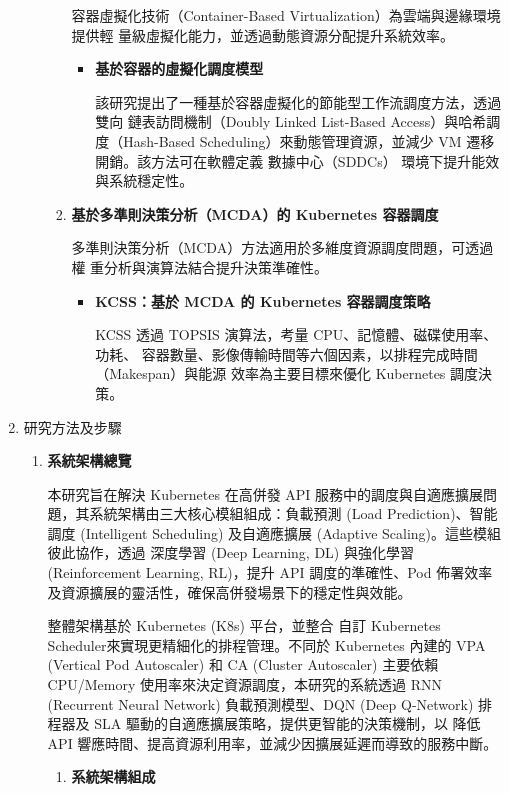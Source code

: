 \documentclass[12pt,a4paper]{article}
\begin{document}
\begin{enumerate}[label={(\zhdig*)}, leftmargin=2\parindent, listparindent=\parindent]
\begin{enumerate}[label={(\arabic*)}, leftmargin=\parindent, listparindent=\parindent]
\begin{enumerate}[label={(\arabic*)}, leftmargin=\parindent, listparindent=\parindent]
容器虛擬化技術（Container-Based Virtualization）為雲端與邊緣環境提供輕
量級虛擬化能力，並透過動態資源分配提升系統效率。
\begin{itemize}[leftmargin=\parindent, listparindent=\parindent]
    \item \textbf{
\cite{15} 基於容器的虛擬化調度模型
    }

該研究提出了一種基於容器虛擬化的節能型工作流調度方法，透過雙向
鏈表訪問機制（Doubly Linked List-Based Access）與哈希調度（Hash-Based
Scheduling）來動態管理資源，並減少 VM 遷移開銷。該方法可在軟體定義
數據中心（SDDCs） 環境下提升能效與系統穩定性。

    \end{itemize}
    \item \textbf{
基於多準則決策分析（MCDA）的 Kubernetes 容器調度
}

多準則決策分析（MCDA）方法適用於多維度資源調度問題，可透過權
重分析與演算法結合提升決策準確性。
\begin{itemize}[leftmargin=\parindent, listparindent=\parindent]
    \item \textbf{
\cite{16} KCSS：基於 MCDA 的 Kubernetes 容器調度策略
    }

KCSS 透過 TOPSIS 演算法，考量 CPU、記憶體、磁碟使用率、功耗、
容器數量、影像傳輸時間等六個因素，以排程完成時間（Makespan）與能源
效率為主要目標來優化 Kubernetes 調度決策。

    \end{itemize}

\end{enumerate}
\end{enumerate}
\item 研究方法及步驟
\begin{enumerate}[label={(\arabic*)}, leftmargin=\parindent, listparindent=\parindent]

\item \textbf{
系統架構總覽
}

本研究旨在解決 Kubernetes 在高併發 API 服務中的調度與自適應擴展問題，其系統架構由三大核心模組組成：負載預測 (Load Prediction)、智能調度 (Intelligent Scheduling) 及自適應擴展 (Adaptive Scaling)。這些模組彼此協作，透過 深度學習 (Deep Learning, DL) 與強化學習 (Reinforcement Learning, RL)，提升 API 調度的準確性、Pod 佈署效率及資源擴展的靈活性，確保高併發場景下的穩定性與效能。

整體架構基於 Kubernetes (K8s) 平台，並整合 自訂 Kubernetes Scheduler\cite{19}來實現更精細化的排程管理。不同於 Kubernetes 內建的 VPA (Vertical Pod Autoscaler) 和 CA (Cluster Autoscaler) 主要依賴 CPU/Memory 使用率來決定資源調度\cite{18}，本研究的系統透過 RNN (Recurrent Neural Network) 負載預測模型、DQN (Deep Q-Network) 排程器及 SLA 驅動的自適應擴展策略，提供更智能的決策機制，以 降低 API 響應時間、提高資源利用率，並減少因擴展延遲而導致的服務中斷。
\begin{enumerate}[label={(\zhdig*)}, leftmargin=\parindent, listparindent=\parindent]
\item \textbf{
系統架構組成}


\end{enumerate}
\end{enumerate}
\end{enumerate}
\end{document}
